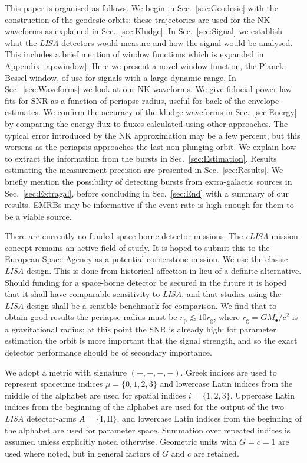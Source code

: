 \documentclass[useAMS,usedcolumn,usegraphicx,usenatbib]{mn2e}
\newcommand{\secref}[1]{Sec.~\ref{sec:#1}}
\newcommand{\apref}[1]{Appendix~\ref{ap:#1}}
\newcommand{\sub}[1]{\ensuremath{_\mathrm{#1}}}
\begin{document}
This paper is organised as follows. We begin in \secref{Geodesic} with the construction of the geodesic orbits; these trajectories are used for the NK waveforms as explained in \secref{Kludge}. In \secref{Signal} we establish what the \textit{LISA} detectors would measure and how the signal would be analysed. This includes a brief mention of window functions which is expanded in \apref{window}. Here we present a novel window function, the Planck-Bessel window, of use for signals with a large dynamic range. In \secref{Waveforms} we look at our NK waveforms. We give fiducial power-law fits for SNR as a function of periapse radius, useful for back-of-the-envelope estimates. We confirm the accuracy of the kludge waveforms in \secref{Energy} by comparing the energy flux to fluxes calculated using other approaches. The typical error introduced by the NK approximation may be a few percent, but this worsens as the periapsis approaches the last non-plunging orbit. We explain how to extract the information from the bursts in \secref{Estimation}. Results estimating the measurement precision are presented in \secref{Results}. We briefly mention the possibility of detecting bursts from extra-galactic sources in \secref{Extragal}, before concluding in \secref{End} with a summary of our results. EMRBs may be informative if the event rate is high enough for them to be a viable source.

There are currently no funded space-borne detector missions. The \textit{eLISA} mission concept remains an active field of study. It is hoped to submit this to the European Space Agency as a potential cornerstone mission. We use the classic \textit{LISA} design. This is done from historical affection in lieu of a definite alternative. Should funding for a space-borne detector be secured in the future it is hoped that it shall have comparable sensitivity to \textit{LISA}, and that studies using the \textit{LISA} design shall be a sensible benchmark for comparison. We find that to obtain good results the periapse radius must be $r\sub{p} \lesssim 10 r\sub{g}$, where $r\sub{g} = GM_\bullet / c^2$ is a gravitational radius; at this point the SNR is already high: for parameter estimation the orbit is more important that the signal strength, and so the exact detector performance should be of secondary importance.

We adopt a metric with signature $(+,-,-,-)$. Greek indices are used to represent spacetime indices $\mu = \{0,1,2,3\}$ and lowercase Latin indices from the middle of the alphabet are used for spatial indices $i = \{1,2,3\}$. Uppercase Latin indices from the beginning of the alphabet are used for the output of the two \textit{LISA} detector-arms $A = \{\mathrm{I}, \mathrm{II}\}$, and lowercase Latin indices from the beginning of the alphabet are used for parameter space. Summation over repeated indices is assumed unless explicitly noted otherwise. Geometric units with $G = c = 1$ are used where noted, but in general factors of $G$ and $c$ are retained.
\end{document}
